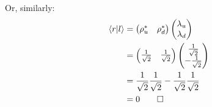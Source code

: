 \documentclass[solutions.tex]{subfiles}
\begin{document}
Or, similarly:
\begin{align*}
\left\langle r \middle| l \right\rangle & =
\begin{pmatrix}
	\rho_u^* & \rho_d^* \\
\end{pmatrix}
\begin{pmatrix}
	\lambda_u \\
	\lambda_d \\
\end{pmatrix} \\
~ & = \begin{pmatrix}
	\frac1{\sqrt2} & \frac1{\sqrt2} \\
\end{pmatrix}
\begin{pmatrix}
	\frac1{\sqrt2} \\
	-\frac1{\sqrt2} \\
\end{pmatrix} \\
~ & = \frac1{\sqrt2}\frac1{\sqrt2}-\frac1{\sqrt2}\frac1{\sqrt2} \\
~ & = 0 \qed\\
\end{align*}
\end{document}
